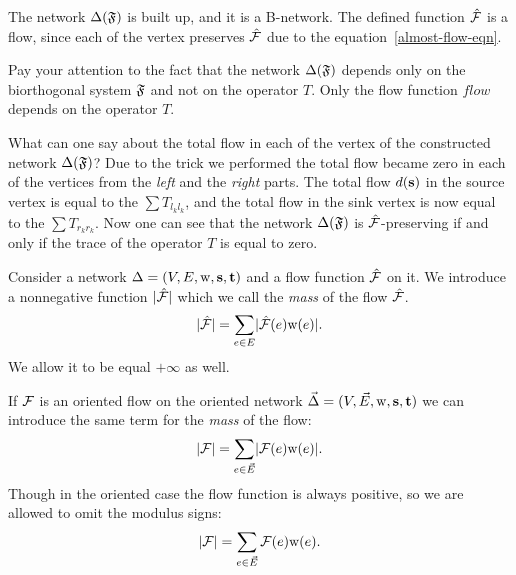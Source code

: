 \documentclass[12pt]{amsart}
\begin{document}
    The network $\Delta(\mathfrak{F})$ is built up, and it is a B-network.
    The defined function $\mathcal{\hat{F}}$ is a flow, since each of the vertex preserves
      $\mathcal{\hat{F}}$ due to the equation~\eqref{almost-flow-eqn}.
    \begin{remark}
      Pay your attention to the fact that the network $\Delta(\mathfrak{F})$
        depends only on the biorthogonal system $\mathfrak{F}$ and not on the operator $T$.
      Only the flow function $flow$ depends on the operator $T$.
    \end{remark}
    What can one say about the total flow in each of the vertex of the constructed network $\Delta(\mathfrak{F})$?
    Due to the trick we performed the total flow became zero in each of the vertices from the \emph{left} and the \emph{right} parts.
    The total flow $d(\mathbf{s})$ in the source vertex is equal to the $\sum T_{l_k l_k}$, and the total flow in the
      sink vertex is now equal to the $\sum T_{r_k r_k}$.
    Now one can see that the network $\Delta(\mathfrak{F})$ is $\mathcal{\hat{F}}$-preserving if and only if the trace of the operator $T$ is equal to
      zero.
    \begin{definition}
      Consider a network $\Delta = (V, E, \mathrm{w}, \mathbf{s}, \mathbf{t})$ and a flow function $\mathcal{\hat{F}}$ on it.
      We introduce a nonnegative function $\lvert\mathcal{\hat{F}}\rvert$ which we call the \emph{mass} of the flow $\mathcal{\hat{F}}$.
      \[
        \lvert\mathcal{\hat{F}}\rvert = \sum_{e \in E} \lvert\mathcal{\hat{F}}(e) \mathrm{w}(e)\rvert.
      \]
      We allow it to be equal $+\infty$ as well.
    \end{definition}
    \begin{definition}
      If $\mathcal{F}$ is an oriented flow on the oriented network $\vec{\Delta} = (V,\vec{E},\mathrm{w}, \mathbf{s}, \mathbf{t})$ 
        we can introduce the same term for the \emph{mass} of the flow:
      \[
        \lvert\mathcal{F}\rvert = \sum_{e \in \vec{E}} \lvert\mathcal{F}(e) \mathrm{w}(e)\rvert.
      \]
      Though in the oriented case the flow function is always positive,
        so we are allowed to omit the modulus signs:
      \[
        \lvert\mathcal{F}\rvert = \sum_{e \in \vec{E}} \mathcal{F}(e) \mathrm{w}(e).
      \]
    \end{definition}
\end{document}

